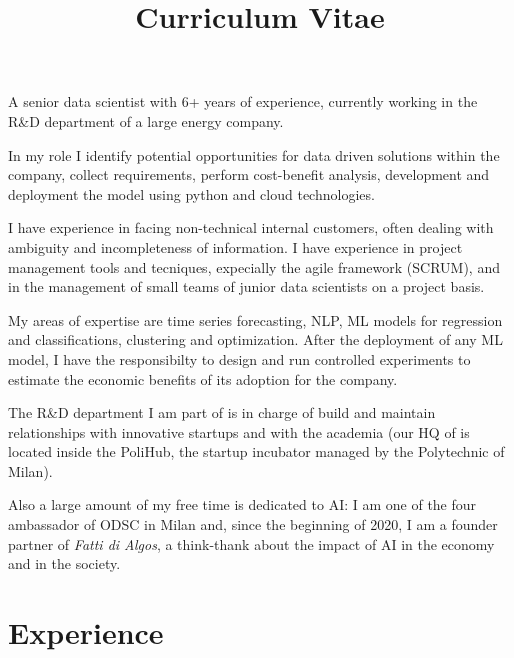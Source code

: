 \documentclass[11pt,a4paper,sans]{moderncv}        %
\title{Curriculum Vitae}                               %
\begin{document}
\makecvtitle
\small{A senior data scientist with 6+ years of experience, currently working in the R\&D department of a large energy company.

In my role I  identify potential opportunities for data driven solutions within the company, collect requirements, perform cost-benefit analysis, development and deployment the model using python and cloud technologies.

I have experience in facing non-technical internal customers, often dealing with ambiguity and incompleteness of information. I have experience in project management tools and tecniques, expecially the agile framework (SCRUM), and in the management of small teams of junior data scientists on a project basis.

My areas of expertise are time series forecasting, NLP,  ML models for regression and classifications, clustering and optimization. After the deployment of any ML model, I have the responsibilty to design and run controlled experiments to estimate the economic benefits of its adoption for the company.

The R\&D department I am part of is in charge of build and maintain relationships with innovative startups and with the academia (our HQ of is located inside the PoliHub, the startup incubator managed by the Polytechnic of Milan).

Also a large amount of my free time is dedicated to AI: I am one of the four ambassador of ODSC in Milan and, since the beginning of 2020, I am a founder partner of \emph{Fatti di Algos}, a think-thank about the impact of AI in the economy and in the society.}

\section{Experience}
\end{document}
